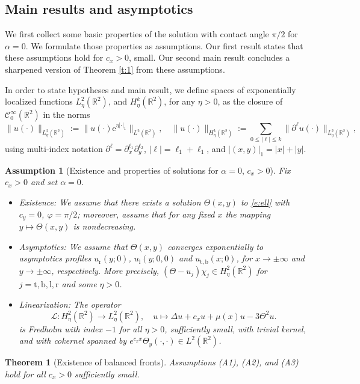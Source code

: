 \documentclass[10pt]{article}
\newtheorem{Theorem}[Lemma]{Theorem}
\newtheorem*{Assumption}[Lemma]{Assumption}
\newcommand{\R}{\mathbb{R}}
\newcommand{\rme}{\mathrm{e}}
\renewcommand{\leq}{\leqslant}
\begin{document}
\subsection{Main results and asymptotics}\label{s:22}
We first collect some basic properties of the solution with contact angle $\pi/2$ for $\alpha=0$. We formulate those properties as assumptions. Our first result states that these assumptions hold for $c_x>0$, small.  Our second main result concludes a sharpened version of Theorem \ref{t:1} from these assumptions. 

In order to state hypotheses and main result, we define spaces of exponentially localized functions $L^2_\eta(\R^2)$, and $H^k_\eta(\R^2)$, for any $\eta>0$, as the closure of $\mathcal{C}^\infty_0(\R^2)$ in the norms
\[
\|u(\cdot)\|_{L^2_\eta(\R^2)}:=\|u(\cdot)\rme^{\eta |\cdot |_1}\|_{L^2(\R^2)},\quad \|u(\cdot)\|_{H^k_\eta(\R^2)}:=\sum_{0\leq |\ell|\leq k}\|\partial^\ell u(\cdot)\|_{L^2_\eta(\R^2)},
\]
using multi-index notation $\partial^\ell=\partial_x^{\ell_1}\partial_y^{\ell_2}$, $|\ell|=\ell_1+\ell_1$, and $|(x,y)|_1=|x|+|y|$. 

\begin{Assumption}[Existence and properties of solutions for $\alpha=0$, $c_x>0$]\label{h:1}
Fix $c_x>0$ and set $\alpha=0$. 
\begin{itemize}
 \item [(A1)] \emph{Existence:} We assume that there exists a solution $\Theta(x,y)$ to  \eqref{e:ell}  with $c_y=0$, $\varphi=\pi/2$; moreover, assume that for any fixed $x$ the mapping $y \mapsto \Theta(x,y)$ is nondecreasing.
 \item [(A2)] \emph{Asymptotics:} We assume that $\Theta(x,y)$ converges exponentially to asymptotics profiles $u_\mathrm{r}(y;0)$, $u_\mathrm{l}(y;0,0)$ and $u_\mathrm{t,b}(x;0)$, for $x\to\pm\infty$ and $y\to\pm\infty$, respectively. More precisely, 
$(\Theta-u_j)\chi_j \in H^2_\eta(\R^2)$ for $j=\mathrm{t,b,l,r}$ and some $\eta>0$.
  \item [(A3)]  \emph{Linearization:} The operator 
 \[
\mathscr{L}: H_\eta^2(\R^2)  \to L^2_\eta(\R^2), \quad u\mapsto \Delta u + c_x u + \mu(x)u-3\Theta^2u.
\]
is  Fredholm with index $-1$ for all $\eta>0$, sufficiently small, with trivial kernel, and with cokernel spanned by $e^{c_x x}\Theta_y(\cdot,\cdot)\in L^2(\R^2)$.
\end{itemize}
%
\end{Assumption}

\begin{Theorem}[Existence of balanced fronts]\label{Theorem:small_c_x} Assumptions  (A1), (A2), and (A3) hold for all  $c_x > 0$ sufficiently small. 
\end{Theorem}
%
\end{document}
